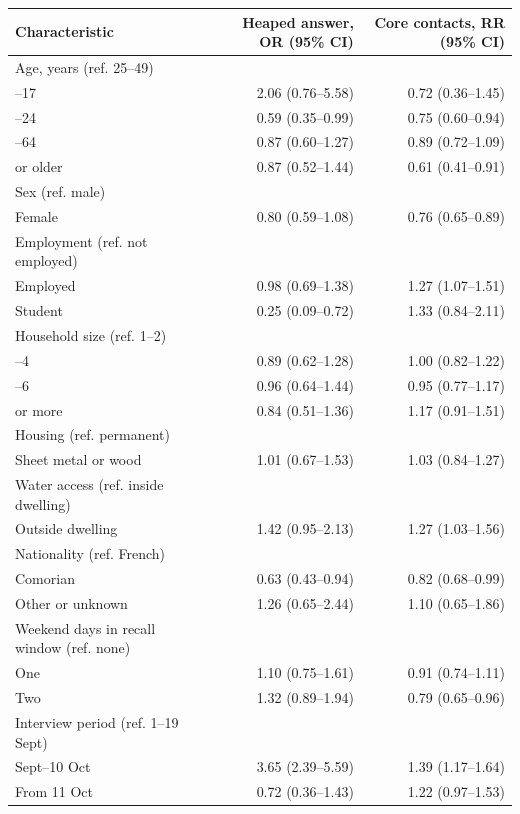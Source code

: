 \begin{tabular}{lrr}
\toprule
Characteristic & Heaped answer, OR (95\% CI) & Core contacts, RR (95\% CI) \\
\midrule
Age, years (ref. 25--49) &  &  \\
\quad 15--17 & 2.06 (0.76--5.58) & 0.72 (0.36--1.45) \\
\quad 18--24 & 0.59 (0.35--0.99) & 0.75 (0.60--0.94) \\
\quad 50--64 & 0.87 (0.60--1.27) & 0.89 (0.72--1.09) \\
\quad 65 or older & 0.87 (0.52--1.44) & 0.61 (0.41--0.91) \\
\addlinespace
Sex (ref. male) &  &  \\
\quad Female & 0.80 (0.59--1.08) & 0.76 (0.65--0.89) \\
\addlinespace
Employment (ref. not employed) &  &  \\
\quad Employed & 0.98 (0.69--1.38) & 1.27 (1.07--1.51) \\
\quad Student & 0.25 (0.09--0.72) & 1.33 (0.84--2.11) \\
\addlinespace
Household size (ref. 1--2) &  &  \\
\quad 3--4 & 0.89 (0.62--1.28) & 1.00 (0.82--1.22) \\
\quad 5--6 & 0.96 (0.64--1.44) & 0.95 (0.77--1.17) \\
\quad 7 or more & 0.84 (0.51--1.36) & 1.17 (0.91--1.51) \\
\addlinespace
Housing (ref. permanent) &  &  \\
\quad Sheet metal or wood & 1.01 (0.67--1.53) & 1.03 (0.84--1.27) \\
\addlinespace
Water access (ref. inside dwelling) &  &  \\
\quad Outside dwelling & 1.42 (0.95--2.13) & 1.27 (1.03--1.56) \\
\addlinespace
Nationality (ref. French) &  &  \\
\quad Comorian & 0.63 (0.43--0.94) & 0.82 (0.68--0.99) \\
\quad Other or unknown & 1.26 (0.65--2.44) & 1.10 (0.65--1.86) \\
\addlinespace
Weekend days in recall window (ref. none) &  &  \\
\quad One & 1.10 (0.75--1.61) & 0.91 (0.74--1.11) \\
\quad Two & 1.32 (0.89--1.94) & 0.79 (0.65--0.96) \\
\addlinespace
Interview period (ref. 1--19 Sept) &  &  \\
\quad 20 Sept--10 Oct & 3.65 (2.39--5.59) & 1.39 (1.17--1.64) \\
\quad From 11 Oct & 0.72 (0.36--1.43) & 1.22 (0.97--1.53) \\
\bottomrule
\end{tabular}
